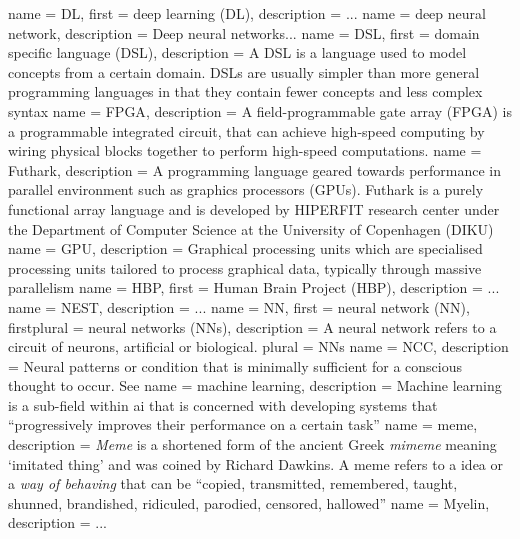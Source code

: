  {
  name = {DL},
  first = {deep learning (DL)},
  description = {...}
}
 {
  name = {deep neural network},
  description = {Deep neural networks...}
}
 {
  name = {DSL},
  first = {domain specific language (DSL)},
  description = {A DSL is a language used to model concepts from a certain
    domain. DSLs are usually simpler than more general programming languages in
    that they contain fewer concepts and less complex syntax}
}
 {
  name = {FPGA},
  description = {A field-programmable gate array (FPGA) is a programmable
		 integrated circuit, that can achieve high-speed computing
		 by wiring physical blocks together to perform high-speed
		 computations.}
}
 {
   name = {Futhark},
   description = {A programming language geared towards performance in parallel environment such as
   graphics processors (GPUs). Futhark is a purely functional array language and is
   developed by HIPERFIT research center under the Department of Computer Science at the
   University of Copenhagen (DIKU)}
}
 {
  name = GPU,
  description = {Graphical processing units which are specialised processing units
                 tailored to process graphical data, typically through massive parallelism}
}
 {
  name = HBP,
  first = {Human Brain Project (HBP)},
  description = {...}
}
 {
  name = NEST,
  description = {...}
}
 {
  name = {NN},
  first = {neural network (NN)},
  firstplural = {neural networks (NNs)},
  description = {A neural network refers to a circuit of neurons, artificial or biological.}
  plural = {NNs}
}
 {
   name = {NCC},
   description = {Neural patterns or condition that is minimally sufficient for a conscious
thought to occur. See \autocite{atkinson2000, Hohwy2009}}
}
 {
  name = machine learning,
  description = {Machine learning is a sub-field within \gls{ai} that is concerned
    with developing systems that ``progressively improves their performance on a
    certain task'' \autocite{wiki:ml}}
}
 {
name = meme,
description = {\textit{Meme} is a shortened form of the ancient Greek \textit{mimeme} meaning
`imitated thing' and was coined by Richard Dawkins. A meme refers to a idea or a
\textit{way of behaving} that can be \enquote{copied, transmitted, remembered, taught, shunned,
brandished, ridiculed, parodied, censored, hallowed} \autocite{dennett2017}}
}
 {
  name = Myelin,
  description = {...}
}
